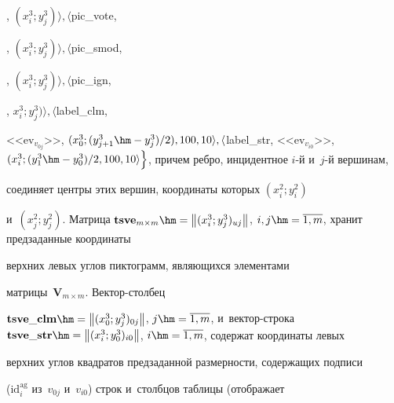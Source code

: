   , $(x_i^3; y_j^3)\rangle, \langle$pic\_vote, 

  , $(x_i^3; y_j^3)\rangle, \langle$pic\_smod, 

, $(x_i^3; y_j^3)\rangle, \langle$pic\_ign, 

, $x_i^3; y_j^3)\rangle, \langle$label\_clm, 

<<$\mathrm{ev}_{v_{0j}}$>>, $(x_0^3; (y^3_{j+1}\hm- y_j^3)/2), 100, 10\rangle, 

\langle$label\_str, <<$\mathrm{ev}_{v_{i0}}$>>, $(x_i^3; (y_1^3\hm- y_0^3)/2, 100, 

10\rangle \Big\}$, причем ребро, инцидентное $i$-й и~$j$-й вершинам, 

соединяет центры этих вершин, координаты которых $(x_i^2; y_i^2)$ 

и~$(x_j^2; y_j^2)$. Матрица $\mathbf{tsve}_{m\times m} \hm= \left\| ( x_i^3; 

y_j^3)_{uj}\right\|$, $i,j\hm= \overline{1,m}$, хранит предзаданные координаты 

верхних левых углов пиктограмм, являющихся элементами 

матрицы~$\mathbf{V}_{m\times m}$. Век\-тор-стол\-бец 

$\mathbf{tsve}\_\mathbf{clm} \hm= \left\| ( x_0^3; y_j^3)_{0j}\right\|$, $j\hm= 

\overline{1,m}$, и~век\-тор-стро\-ка $\mathbf{tsve}\_\mathbf{str} \hm= \left\| 

(x_i^3; y_0^3)_{i0}\right\|$, $i\hm= \overline{1,m}$, содержат координаты левых 

верхних углов квадратов предзаданной размерности, содержащих подписи 

($\mathrm{id}_i^{\mathrm{ag}}$ из~$v_{0j}$ и~$v_{i0}$) строк и~столбцов таб\-ли\-цы (отображает 

